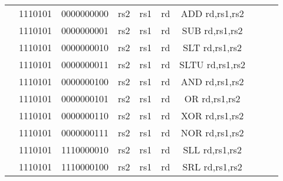 \begin{table}[p]
\begin{small}
\begin{center}
\begin{tabular}{rcccccccccccl}
&
\multicolumn{1}{|c|}{1110101} &
\multicolumn{4}{c|}{0000000000} &
\multicolumn{1}{c|}{rs2} &
\multicolumn{1}{c|}{rs1} &
\multicolumn{1}{c|}{rd} & ADD rd,rs1,rs2 \\
\cline{2-9}
  

&
\multicolumn{1}{|c|}{1110101} &
\multicolumn{4}{c|}{0000000001} &
\multicolumn{1}{c|}{rs2} &
\multicolumn{1}{c|}{rs1} &
\multicolumn{1}{c|}{rd} & SUB rd,rs1,rs2 \\
\cline{2-9}
  

&
\multicolumn{1}{|c|}{1110101} &
\multicolumn{4}{c|}{0000000010} &
\multicolumn{1}{c|}{rs2} &
\multicolumn{1}{c|}{rs1} &
\multicolumn{1}{c|}{rd} & SLT rd,rs1,rs2 \\
\cline{2-9}
  

&
\multicolumn{1}{|c|}{1110101} &
\multicolumn{4}{c|}{0000000011} &
\multicolumn{1}{c|}{rs2} &
\multicolumn{1}{c|}{rs1} &
\multicolumn{1}{c|}{rd} & SLTU rd,rs1,rs2 \\
\cline{2-9}
  

&
\multicolumn{1}{|c|}{1110101} &
\multicolumn{4}{c|}{0000000100} &
\multicolumn{1}{c|}{rs2} &
\multicolumn{1}{c|}{rs1} &
\multicolumn{1}{c|}{rd} & AND rd,rs1,rs2 \\
\cline{2-9}
  

&
\multicolumn{1}{|c|}{1110101} &
\multicolumn{4}{c|}{0000000101} &
\multicolumn{1}{c|}{rs2} &
\multicolumn{1}{c|}{rs1} &
\multicolumn{1}{c|}{rd} & OR rd,rs1,rs2 \\
\cline{2-9}
  

&
\multicolumn{1}{|c|}{1110101} &
\multicolumn{4}{c|}{0000000110} &
\multicolumn{1}{c|}{rs2} &
\multicolumn{1}{c|}{rs1} &
\multicolumn{1}{c|}{rd} & XOR rd,rs1,rs2 \\
\cline{2-9}
  

&
\multicolumn{1}{|c|}{1110101} &
\multicolumn{4}{c|}{0000000111} &
\multicolumn{1}{c|}{rs2} &
\multicolumn{1}{c|}{rs1} &
\multicolumn{1}{c|}{rd} & NOR rd,rs1,rs2 \\
\cline{2-9}
  

&
\multicolumn{1}{|c|}{1110101} &
\multicolumn{4}{c|}{1110000010} &
\multicolumn{1}{c|}{rs2} &
\multicolumn{1}{c|}{rs1} &
\multicolumn{1}{c|}{rd} & SLL rd,rs1,rs2 \\
\cline{2-9}
  

&
\multicolumn{1}{|c|}{1110101} &
\multicolumn{4}{c|}{1110000100} &
\multicolumn{1}{c|}{rs2} &
\multicolumn{1}{c|}{rs1} &
\multicolumn{1}{c|}{rd} & SRL rd,rs1,rs2 \\
\cline{2-9}
  


\end{tabular}
\end{center}
\end{small}
\end{table}
